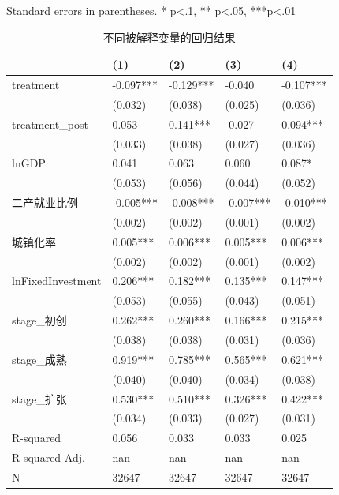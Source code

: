 \bigskip
Standard errors in parentheses. \newline 
* p<.1, ** p<.05, ***p<.01\begin{table}
\caption{不同被解释变量的回归结果}
\label{}
\begin{center}
\begin{tabular}{lllll}
\hline
                  & (1)       & (2)       & (3)       & (4)        \\
\hline
treatment         & -0.097*** & -0.129*** & -0.040    & -0.107***  \\
                  & (0.032)   & (0.038)   & (0.025)   & (0.036)    \\
treatment\_post   & 0.053     & 0.141***  & -0.027    & 0.094***   \\
                  & (0.033)   & (0.038)   & (0.027)   & (0.036)    \\
lnGDP             & 0.041     & 0.063     & 0.060     & 0.087*     \\
                  & (0.053)   & (0.056)   & (0.044)   & (0.052)    \\
二产就业比例            & -0.005*** & -0.008*** & -0.007*** & -0.010***  \\
                  & (0.002)   & (0.002)   & (0.001)   & (0.002)    \\
城镇化率              & 0.005***  & 0.006***  & 0.005***  & 0.006***   \\
                  & (0.002)   & (0.002)   & (0.001)   & (0.002)    \\
lnFixedInvestment & 0.206***  & 0.182***  & 0.135***  & 0.147***   \\
                  & (0.053)   & (0.055)   & (0.043)   & (0.051)    \\
stage\_初创         & 0.262***  & 0.260***  & 0.166***  & 0.215***   \\
                  & (0.038)   & (0.038)   & (0.031)   & (0.036)    \\
stage\_成熟         & 0.919***  & 0.785***  & 0.565***  & 0.621***   \\
                  & (0.040)   & (0.040)   & (0.034)   & (0.038)    \\
stage\_扩张         & 0.530***  & 0.510***  & 0.326***  & 0.422***   \\
                  & (0.034)   & (0.033)   & (0.027)   & (0.031)    \\
R-squared         & 0.056     & 0.033     & 0.033     & 0.025      \\
R-squared Adj.    & nan       & nan       & nan       & nan        \\
N                 & 32647     & 32647     & 32647     & 32647      \\
\hline
\end{tabular}
\end{center}
\end{table}
